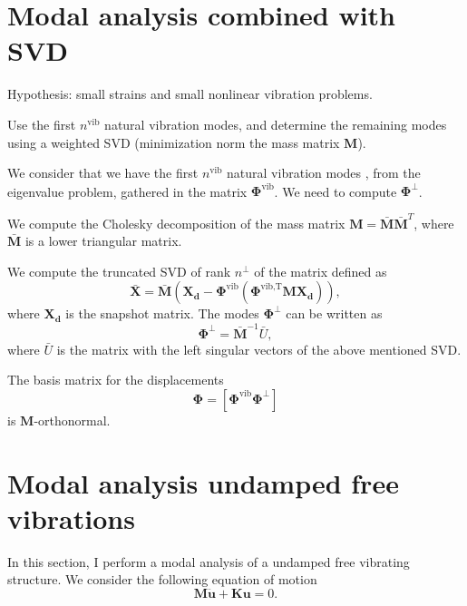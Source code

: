 \documentclass{article}
\begin{document}
\section{Modal analysis combined with SVD \cite{hernandez17}}
Hypothesis: small strains and small nonlinear vibration problems.\newline

Use the first $n^{\text{vib}}$ natural vibration modes, and determine the remaining modes using a weighted SVD (minimization norm the mass matrix $\bm{M}$).\newline

We consider that we have the first $n^{\text{vib}}$ natural vibration modes , from the eigenvalue problem, gathered in the matrix $\bm{\Phi}^{\text{vib}}$. We need to compute $\bm{\Phi}^{\perp}$. \newline

We compute the Cholesky decomposition of the mass matrix $\bm{M} = \bar{\bm{M}} \bar{\bm{M}}^T$, where $\bar{\bm{M}}$ is a lower triangular matrix.\newline

We compute the truncated SVD of rank $n^\perp$ of the matrix defined as
\begin{equation}
  \bar{\bm{X}} = \bar{\bm{M}}(\bm{X_d} - \bm{\Phi}^{\text{vib}}(\bm{\Phi}^{\text{vib,T}} \bm{M} \bm{X_d})),
\end{equation}
where $\bm{X_d}$ is the snapshot matrix. The modes $\bm{\Phi}^{\perp}$ can be written as
\begin{equation}
  \bm{\Phi}^{\perp} = \bar{\bm{M}}^{-1}\bar{U},
\end{equation}
where $\bar{U}$ is the matrix with the left singular vectors of the above mentioned SVD.\newline

The basis matrix for the displacements 
\begin{equation}
  \bm{\Phi} = [\bm{\Phi}^{\text{vib}} \bm{\Phi}^{\perp}]
\end{equation}
is $\bm{M}$-orthonormal.

\section{Modal analysis undamped free vibrations}
In this section, I perform a modal analysis of a undamped free vibrating structure. We consider the following equation of motion
\begin{equation}
  \bm{M}\bm{\ddot{u}} + \bm{K}\bm{u} = 0.
  \label{eq:modal_analysis_motion_equation}
\end{equation}
\end{document}
